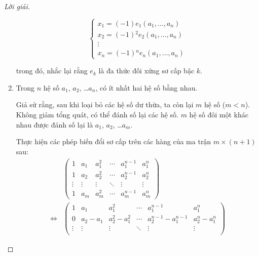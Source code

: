 \documentclass[class=nhvh-linear-algebra,crop=false]{standalone}
\begin{document}
\begin{proof}[Lời giải]
\begin{enumerate}[label = \textbf{Trường hợp \arabic*.},itemindent=2cm]
\[\begin{cases}
                      x_{1} = (-1)e_{1}(a_{1},\ldots,a_{n})       \\
                      x_{2} = (-1){}^{2}e_{2}(a_{1},\ldots,a_{n}) \\
                      \vdots                                      \\
                      x_{n} = (-1){}^{n}e_{n}(a_{1},\ldots,a_{n})
                  \end{cases}
              \]
              \par trong đó, nhắc lại rằng $e_{k}$ là đa thức đối xứng sơ cấp bậc $k$.
        \item Trong $n$ hệ số $a_{1}$, $a_{2}$, \ldots $a_{n}$, có ít nhất hai hệ số bằng nhau.
              \par Giả sử rằng, sau khi loại bỏ các hệ số dư thừa, ta còn lại $m$ hệ số ($m < n$). Không giảm tổng quát, có thể đánh số lại các hệ số. $m$ hệ số đôi một khác nhau được đánh số lại là $a_{1}$, $a_{2}$, \ldots $a_{m}$.
              \par Thực hiện các phép biến đổi sơ cấp trên các hàng của ma trận $m\times(n+1)$ sau:
              \begingroup{}
              \allowdisplaybreaks{}
              \begin{align*}
                                      &
                  \begin{pmatrix}
                      1      & a_{1}  & a_{1}^{2} & \cdots & a_{1}^{n-1} & a_{1}^{n} \\
                      1      & a_{2}  & a_{2}^{2} & \cdots & a_{2}^{n-1} & a_{2}^{n} \\
                      \vdots & \vdots & \vdots    & \ddots & \vdots      & \vdots    \\
                      1      & a_{m}  & a_{m}^{2} & \cdots & a_{m}^{n-1} & a_{m}^{n}
                  \end{pmatrix}                                                                                                                         \\
                  \Longleftrightarrow &
                  \begin{pmatrix}
                      1      & a_{1}         & a_{1}^{2}             & \cdots & a_{1}^{n-1}               & a_{1}^{n}             \\
                      0      & a_{2} - a_{1} & a_{2}^{2} - a_{1}^{2} & \cdots & a_{2}^{n-1} - a_{1}^{n-1} & a_{2}^{n} - a_{1}^{n} \\
                      \vdots & \vdots        & \vdots                & \ddots & \vdots                    & \vdots                \\

\end{pmatrix}
\end{align*}
\end{enumerate}
\end{proof}
\end{document}

